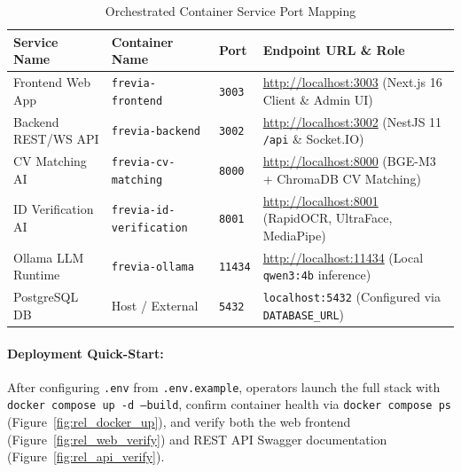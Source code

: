 \begin{table}[H]
\centering
\caption{Orchestrated Container Service Port Mapping}\label{tab:rel_ports}
\renewcommand{\arraystretch}{1.3}
\setlength{\tabcolsep}{5pt}
\small
\begin{tabular}{|L{3.4cm}|L{3.8cm}|C{1.4cm}|L{5.8cm}|}
\hline
{}
\textbf{Service Name} & \textbf{Container Name} & \textbf{Port} & \textbf{Endpoint URL \& Role} \\ \hline
Frontend Web App & \texttt{frevia-frontend} & \texttt{3003} & \url{http://localhost:3003} (Next.js 16 Client \& Admin UI) \\ \hline
Backend REST/WS API & \texttt{frevia-backend} & \texttt{3002} & \url{http://localhost:3002} (NestJS 11 \texttt{/api} \& Socket.IO) \\ \hline
CV Matching AI & \texttt{frevia-cv-matching} & \texttt{8000} & \url{http://localhost:8000} (BGE-M3 + ChromaDB CV Matching) \\ \hline
ID Verification AI & \texttt{frevia-id-verification} & \texttt{8001} & \url{http://localhost:8001} (RapidOCR, UltraFace, MediaPipe) \\ \hline
Ollama LLM Runtime & \texttt{frevia-ollama} & \texttt{11434} & \url{http://localhost:11434} (Local \texttt{qwen3:4b} inference) \\ \hline
PostgreSQL DB & Host / External & \texttt{5432} & \texttt{localhost:5432} (Configured via \texttt{DATABASE\_URL}) \\ \hline
\end{tabular}
\end{table}

\paragraph*{Deployment Quick-Start:} After configuring \texttt{.env} from \texttt{.env.example}, operators launch the full stack with \texttt{docker compose up -d --build}, confirm container health via \texttt{docker compose ps} (Figure~\ref{fig:rel_docker_up}), and verify both the web frontend (Figure~\ref{fig:rel_web_verify}) and REST API Swagger documentation (Figure~\ref{fig:rel_api_verify}).


\label{fig:rel_web_verify}

